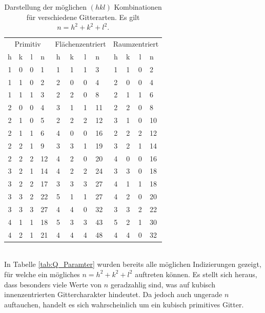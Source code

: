 \documentclass[a4paper,twoside,final]{article}
\begin{document}
\begin{table}[ht]
	\centering
	\caption{Darstellung der möglichen $(hkl)$ Kombinationen für verschiedene Gitterarten. Es gilt $n = h^2+k^2+l^2$.}
	\label{tab:Indizierung}
	\begin{tabular}{c c c l c c c l c c c l}
		\toprule
      \multicolumn{4}{c}{Primitiv} & \multicolumn{4}{c}{Flächenzentriert} & \multicolumn{4}{c}{Raumzentriert}\\
      \cmidrule(lr){1-4}\cmidrule(lr){5-8}\cmidrule(lr){9-12}
      h & k & l & n & h & k & l & n & h & k & l & n \\
      \midrule
      1 & 0 & 0 & 1   & 1 & 1 & 1 & 3   & 1 & 1 & 0 & 2   \\
      1 & 1 & 0 & 2   & 2 & 0 & 0 & 4   & 2 & 0 & 0 & 4   \\
      1 & 1 & 1 & 3   & 2 & 2 & 0 & 8   & 2 & 1 & 1 & 6   \\
      2 & 0 & 0 & 4   & 3 & 1 & 1 & 11  & 2 & 2 & 0 & 8   \\
      2 & 1 & 0 & 5   & 2 & 2 & 2 & 12  & 3 & 1 & 0 & 10  \\
      2 & 1 & 1 & 6   & 4 & 0 & 0 & 16  & 2 & 2 & 2 & 12  \\
      2 & 2 & 1 & 9   & 3 & 3 & 1 & 19  & 3 & 2 & 1 & 14  \\
      2 & 2 & 2 & 12  & 4 & 2 & 0 & 20  & 4 & 0 & 0 & 16  \\
      3 & 2 & 1 & 14  & 4 & 2 & 2 & 24  & 3 & 3 & 0 & 18  \\
      3 & 2 & 2 & 17  & 3 & 3 & 3 & 27  & 4 & 1 & 1 & 18  \\
      3 & 3 & 2 & 22  & 5 & 1 & 1 & 27  & 4 & 2 & 0 & 20  \\
      3 & 3 & 3 & 27  & 4 & 4 & 0 & 32  & 3 & 3 & 2 & 22  \\
      4 & 1 & 1 & 18  & 5 & 3 & 3 & 43  & 5 & 2 & 1 & 30  \\
      4 & 2 & 1 & 21  & 4 & 4 & 4 & 48  & 4 & 4 & 0 & 32
	\end{tabular}
\end{table}\\
In Tabelle \ref{tab:Q_Paramter} wurden bereits alle möglichen Indizierungen gezeigt, für welche ein mögliches $n = h^2+ k^2 +l^2$ auftreten können. Es stellt sich heraus, dass besonders viele Werte von $n$ geradzahlig sind, was auf kubisch innenzentrierten Gittercharakter hindeutet. Da jedoch auch ungerade $n$ auftauchen, handelt es sich wahrscheinlich um ein kubisch primitives Gitter.\\
\end{document}
